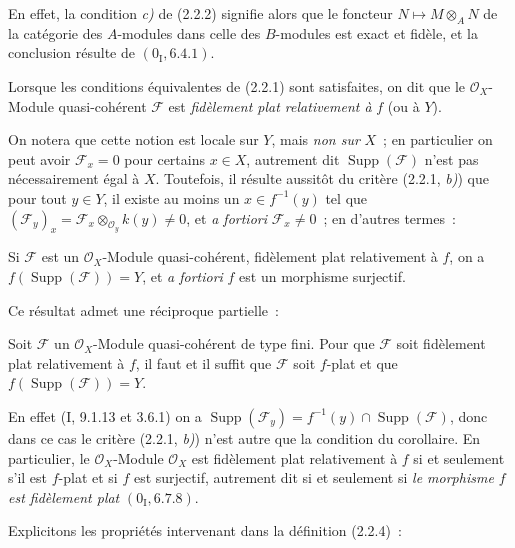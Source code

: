 En effet, la condition \emph{c)} de (2.2.2) signifie alors que le foncteur
$N\mapsto M\otimes_A N$ de la catégorie des $A$-modules dans celle des
$B$-modules est exact et fidèle, et la conclusion résulte de
$(0_{\mathrm I},6.4.1)$.

\begin{definition}[2.2.4]
\label{IV.2.2.4-fr}
Lorsque les conditions équivalentes de (2.2.1) sont satisfaites, on dit que
le $\mathcal O_X$-Module quasi-cohérent $\mathscr F$ est \emph{fidèlement plat
relativement à} $f$ (ou à $Y$).
\end{definition}

On notera que cette notion est locale sur $Y$, mais \emph{non sur} $X$~; en
particulier on peut avoir $\mathscr F_x=0$ pour certains $x\in X$, autrement
dit $\operatorname{Supp}(\mathscr F)$ n'est pas nécessairement égal à $X$.
Toutefois, il résulte aussitôt du critère (2.2.1, \emph{b)}) que pour tout
$y\in Y$, il existe au moins un $x\in f^{-1}(y)$ tel que
$(\mathscr F_y)_x=\mathscr F_x\otimes_{\mathcal O_y}k(y)\neq0$, et
\emph{a fortiori} $\mathscr F_x\neq0$~; en d'autres termes~:

\begin{corollary}[2.2.5]
\label{IV.2.2.5-fr}
Si $\mathscr F$ est un $\mathcal O_X$-Module quasi-cohérent, fidèlement plat
relativement à $f$, on a $f(\operatorname{Supp}(\mathscr F))=Y$, et
\emph{a fortiori} $f$ est un morphisme surjectif.
\end{corollary}

Ce résultat admet une réciproque partielle~:

\begin{corollary}[2.2.6]
\label{IV.2.2.6-fr}
Soit $\mathscr F$ un $\mathcal O_X$-Module quasi-cohérent de type fini. Pour
que $\mathscr F$ soit fidèlement plat relativement à $f$, il faut et il
suffit que $\mathscr F$ soit $f$-plat et que
$f(\operatorname{Supp}(\mathscr F))=Y$.
\end{corollary}

En effet (I, 9.1.13 et 3.6.1) on a
$\operatorname{Supp}(\mathscr F_y)=f^{-1}(y)\cap\operatorname{Supp}(\mathscr F)$,
donc dans ce cas le critère (2.2.1, \emph{b)}) n'est autre que la condition du
corollaire. En particulier, le $\mathcal O_X$-Module $\mathcal O_X$ est
fidèlement plat relativement à $f$ si et seulement s'il est $f$-plat et si
$f$ est surjectif, autrement dit si et seulement si \emph{le morphisme $f$
est fidèlement plat} $(0_{\mathrm I},6.7.8)$.

Explicitons les propriétés intervenant dans la définition (2.2.4)~:

